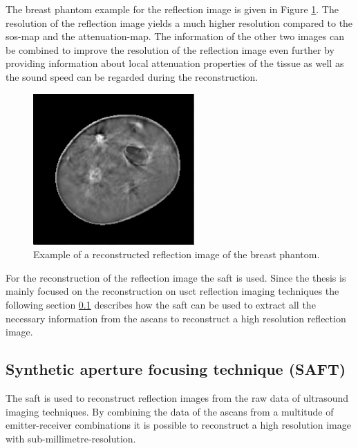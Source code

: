 The breast phantom example for the reflection image is given in Figure \ref{reflecimage_example}. The resolution of the reflection image yields a much higher resolution compared to the \ac{sos}-map and the attenuation-map. The information of the other two images can be combined to improve the resolution of the reflection image even further by providing information about local attenuation properties of the tissue as well as the sound speed can be regarded during the reconstruction.

\begin{figure}[H]
    \centering
    \includegraphics[width=0.55\textwidth]{Graphics/reflection_example.png}
    \caption{ Example of a reconstructed reflection image of the breast phantom.}
    \label{reflecimage_example}
\end{figure}
For the reconstruction of the reflection image the \ac{saft} is used. Since the thesis is mainly focused on the reconstruction on \ac{usct} reflection imaging techniques the following section \ref{sec:SAFT} describes how the \ac{saft} can be used to extract all the necessary information from the \acp{ascan} to reconstruct a high resolution reflection image. 






\subsection{Synthetic aperture focusing technique (SAFT)}
\label{sec:SAFT}
The \ac{saft} is used to reconstruct reflection images from the raw data of ultrasound imaging techniques. By combining the data of the \acp{ascan} from a multitude of emitter-receiver combinations it is possible to reconstruct a high resolution image with sub-millimetre-resolution.

